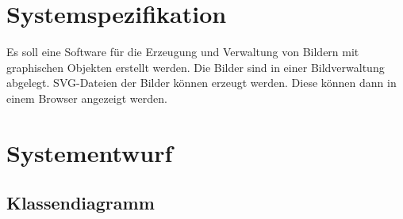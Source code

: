 \documentclass[12pt,a4paper]{article}
\begin{document}
\section{Systemspezifikation}

Es soll eine Software für die Erzeugung und Verwaltung von Bildern mit graphischen Objekten erstellt werden. Die Bilder sind in einer Bildverwaltung abgelegt. SVG-Dateien der Bilder können erzeugt werden. Diese können dann in einem Browser angezeigt werden.
\\

\newpage
\section {Systementwurf}

\subsection {Klassendiagramm}


\newpage
\end{document}
